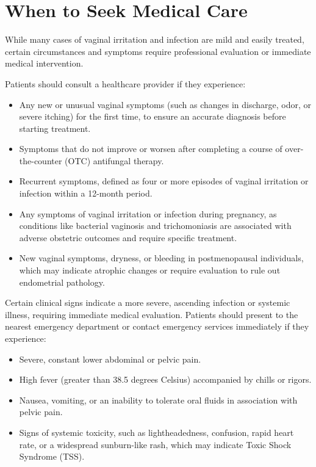 \section*{When to Seek Medical Care}
While many cases of vaginal irritation and infection are mild and easily treated, certain circumstances and symptoms require professional evaluation or immediate medical intervention.

Patients should consult a healthcare provider if they experience:
\begin{itemize}
    \item Any new or unusual vaginal symptoms (such as changes in discharge, odor, or severe itching) for the first time, to ensure an accurate diagnosis before starting treatment.
    \item Symptoms that do not improve or worsen after completing a course of over-the-counter (OTC) antifungal therapy.
    \item Recurrent symptoms, defined as four or more episodes of vaginal irritation or infection within a 12-month period.
    \item Any symptoms of vaginal irritation or infection during pregnancy, as conditions like bacterial vaginosis and trichomoniasis are associated with adverse obstetric outcomes and require specific treatment.
    \item New vaginal symptoms, dryness, or bleeding in postmenopausal individuals, which may indicate atrophic changes or require evaluation to rule out endometrial pathology.
\end{itemize}

Certain clinical signs indicate a more severe, ascending infection or systemic illness, requiring immediate medical evaluation. Patients should present to the nearest emergency department or contact emergency services immediately if they experience:
\begin{itemize}
    \item Severe, constant lower abdominal or pelvic pain.
    \item High fever (greater than 38.5 degrees Celsius) accompanied by chills or rigors.
    \item Nausea, vomiting, or an inability to tolerate oral fluids in association with pelvic pain.
    \item Signs of systemic toxicity, such as lightheadedness, confusion, rapid heart rate, or a widespread sunburn-like rash, which may indicate Toxic Shock Syndrome (TSS).
\end{itemize}

